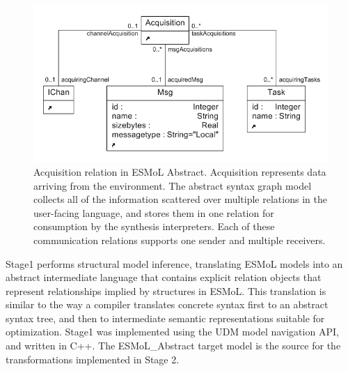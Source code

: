 \begin{figure}
\centering
\includegraphics[width=0.5\columnwidth]{figures/acquisition.png}
    \caption{Acquisition relation in ESMoL Abstract. Acquisition represents
data arriving from the environment. The abstract syntax graph
model collects all of the information scattered over multiple relations in the
user-facing language, and stores them in one relation for consumption by the
synthesis interpreters. Each of these communication relations supports one
sender and multiple receivers. }
    \label{fig:acq_meta}
\end{figure}

Stage1 performs structural model inference, translating ESMoL models into an 
abstract intermediate language that
contains explicit relation objects that represent relationships implied by
structures in ESMoL. This translation is similar to the way a compiler 
translates concrete syntax first to an abstract syntax tree, and then to 
intermediate semantic representations suitable for optimization.  
Stage1 was implemented using the UDM model navigation
API, and written in C++.  The ESMoL\_Abstract target model is the source for
the transformations implemented in Stage 2.

